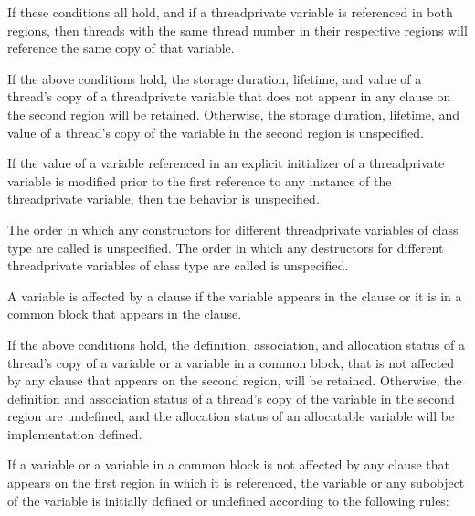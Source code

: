If these conditions all hold, and if a threadprivate variable is referenced in both regions, 
then threads with the same thread number in their respective regions will reference the 
same copy of that variable.

\ccppspecificstart
If the above conditions hold, the storage duration, lifetime, and value of a thread’s copy 
of a threadprivate variable that does not appear in any  clause on the second 
region will be retained. Otherwise, the storage duration, lifetime, and value of a thread’s 
copy of the variable in the second region is unspecified.

If the value of a variable referenced in an explicit initializer of a threadprivate variable 
is modified prior to the first reference to any instance of the threadprivate variable, then 
the behavior is unspecified. 
\ccppspecificend

\cppspecificstart
The order in which any constructors for different threadprivate variables of class type 
are called is unspecified. The order in which any destructors for different threadprivate 
variables of class type are called is unspecified. 
\cppspecificend

\fortranspecificstart
A variable is affected by a  clause if the variable appears in the  clause 
or it is in a common block that appears in the  clause. 

If the above conditions hold, the definition, association, and allocation status of a thread’s 
copy of a  variable or a variable in a  common 
block, that is not affected by any  clause that appears on the second region, will 
be retained. Otherwise, the definition and association status of a thread’s copy of the 
variable in the second region are undefined, and the allocation status of an allocatable 
variable will be implementation defined. 

If a  variable or a variable in a  common block is 
not affected by any  clause that appears on the first  region in which 
it is referenced, the variable or any subobject of the variable is initially defined or 
undefined according to the following rules:

